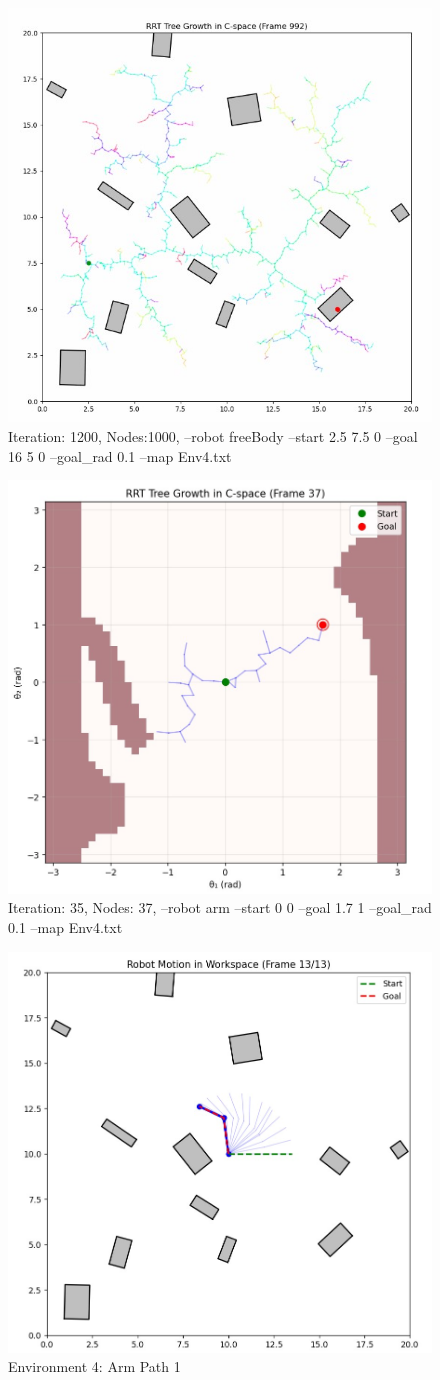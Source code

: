\documentclass{article}
\begin{document}
\begin{figure} [H]
    \centering
    \includegraphics[width=0.5\linewidth]{latex_media/Env4TreeGrowthFB2.jpg}
    \caption{Iteration: 1200, Nodes:1000, --robot freeBody --start 2.5 7.5  0 --goal 16 5 0 --goal\_rad 0.1 --map Env4.txt}
\end{figure}

\begin{figure} [H]
    \centering
    \includegraphics[width=0.5\linewidth]{latex_media/Env4TreeGrowthA1.jpg}
    \caption{Iteration: 35, Nodes: 37, --robot arm --start 0 0 --goal 1.7 1 --goal\_rad 0.1 --map Env4.txt}
\end{figure}

\begin{figure} [H]
    \centering
    \includegraphics[width=0.5\linewidth]{latex_media/Env4RobotPathA1.jpg}
    \caption{Environment 4: Arm Path 1}
\end{figure}
\end{document}
